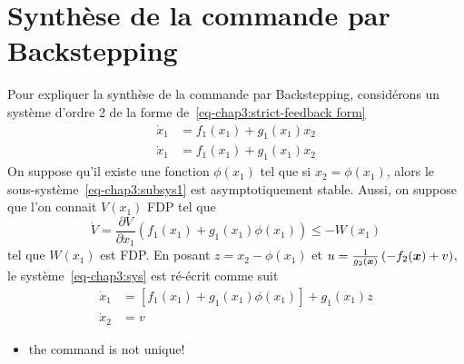 \section{Synthèse de la commande par Backstepping}
Pour expliquer la synthèse de la commande par Backstepping, considérons un système d'ordre 2 de la forme de~\eqref{eq-chap3:strict-feedback form}
	\begin{subequations}\label{eq-chap3:sys}
		\begin{align}
			\label{eq-chap3:subsys1}	\dot{x}_1 &= f_1(x_1) + g_1(x_1)x_2\\
			\label{eq-chap3:subsys2}	\dot{x}_1 &= f_1(x_1) + g_1(x_1)x_2
		\end{align}
	\end{subequations}
On suppose qu'il existe une fonction $\phi(x_1)$ tel que si $x_2 = \phi(x_1)$, alors le sous-système~\eqref{eq-chap3:subsys1} est asymptotiquement stable. Aussi, on suppose que l'on connait $V(x_1)$ FDP tel que 
\begin{equation}
	\dot{V}=\frac{\partial V}{\partial x_1}\left(f_1(x_1) + g_1(x_1)\phi(x_1)\right)\leq - W(x_1)
\end{equation}
tel que $W(x_1)$ est FDP. En posant $z=x_2-\phi(x_1)$ et $u = \frac{1}{g_2(\bm{x})}\left(-f_2(\bm{x}) + v\right)$,  le système~\eqref{eq-chap3:sys} est ré-écrit comme suit 
	\begin{subequations}%
	\begin{align}
			\dot{x}_1 &= \left[f_1(x_1) + g_1(x_1)\phi(x_1)\right] + g_1(x_1)z\\
			\dot{x}_2 &= v
	\end{align}
	\end{subequations}
\begin{itemize}
	\item the command is not unique!
\end{itemize}
